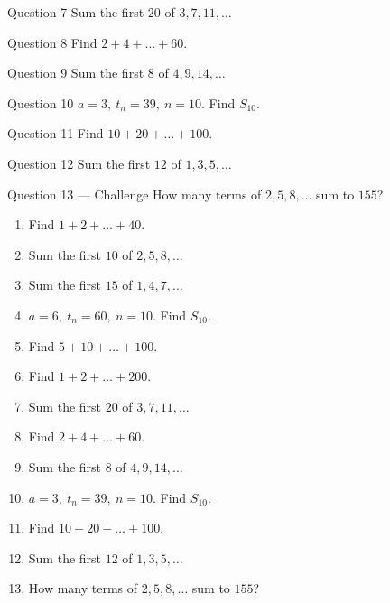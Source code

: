 \documentclass[11pt]{article}
\begin{document}
\begin{qbox}{Question 7}
Sum the first $20$ of $3,7,11,\dots$\workspace{2.4cm}
\end{qbox}

\begin{qbox}{Question 8}
Find $2+4+\dots+60$.\workspace{2.4cm}
\end{qbox}

\begin{qbox}{Question 9}
Sum the first $8$ of $4,9,14,\dots$\workspace{2.4cm}
\end{qbox}

\begin{qbox}{Question 10}
$a=3,\ t_n=39,\ n=10$. Find $S_{10}$.\workspace{2.4cm}
\end{qbox}

\begin{qbox}{Question 11}
Find $10+20+\dots+100$.\workspace{2.4cm}
\end{qbox}

\begin{qbox}{Question 12}
Sum the first $12$ of $1,3,5,\dots$\workspace{2.4cm}
\end{qbox}

\begin{qbox}{Question 13 --- Challenge}
How many terms of $2,5,8,\dots$ sum to $155$?\workspace{3.5cm}
\end{qbox}

\clearpage
{}

\begin{recapbox}
\begin{multicols}{2}
\small
\begin{enumerate}[leftmargin=*,itemsep=3pt]
  \item Find $1+2+\dots+40$.
  \item Sum the first $10$ of $2,5,8,\dots$
  \item Sum the first $15$ of $1,4,7,\dots$
  \item $a=6,\ t_n=60,\ n=10$. Find $S_{10}$.
  \item Find $5+10+\dots+100$.
  \item Find $1+2+\dots+200$.
  \item Sum the first $20$ of $3,7,11,\dots$
  \item Find $2+4+\dots+60$.
  \item Sum the first $8$ of $4,9,14,\dots$
  \item $a=3,\ t_n=39,\ n=10$. Find $S_{10}$.
  \item Find $10+20+\dots+100$.
  \item Sum the first $12$ of $1,3,5,\dots$
  \item How many terms of $2,5,8,\dots$ sum to $155$?
\end{enumerate}
\end{multicols}
\end{recapbox}
\end{document}
